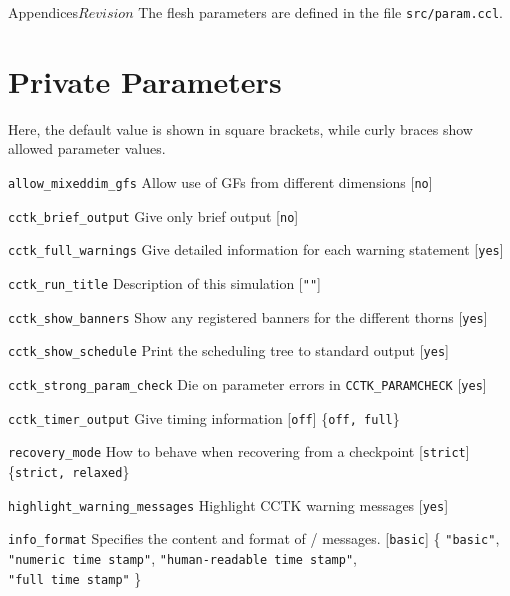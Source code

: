 \begin{cactuspart}{Appendices}{}{$Revision$}
The flesh parameters are defined in the file {\tt src/param.ccl}.

\section{Private Parameters}

Here, the default value is shown in square brackets, while curly braces show allowed parameter values.

\begin{Lentry}

\item[{\tt allow\_mixeddim\_gfs}]
Allow use of GFs from different dimensions [{\tt no}]

\item [{\tt cctk\_brief\_output}]
Give only brief output [{\tt no}]

\item[{\tt cctk\_full\_warnings}]
Give detailed information for each warning statement [{\tt yes}]

\item [{\tt cctk\_run\_title}]
Description of this simulation [{\tt ""}]

\item [{\tt cctk\_show\_banners}]
Show any registered banners for the different thorns [{\tt yes}]

\item [{\tt cctk\_show\_schedule}]
Print the scheduling tree to standard output [{\tt yes}]

\item[{\tt cctk\_strong\_param\_check}]
Die on parameter errors in {\tt CCTK\_PARAMCHECK} [{\tt yes}]

\item[{\tt cctk\_timer\_output}]
Give timing information [{\tt off}] \{{\tt off, full}\}

\item[{\tt recovery\_mode}]
How to behave when recovering from a checkpoint [{\tt strict}] \{{\tt strict, relaxed}\}

\item[{\tt highlight\_warning\_messages}]
Highlight CCTK warning messages [{\tt yes}]

\item[{\tt info\_format}]
Specifies the content and format of /
messages. [{\tt basic}]
\{%
\mbox{{\tt "basic"}},
\mbox{{\tt "numeric time stamp"}},
\mbox{{\tt "human-readable time stamp"}},\\
\mbox{{\tt "full time stamp"}}%
\}


\end{Lentry}
\end{cactuspart}
